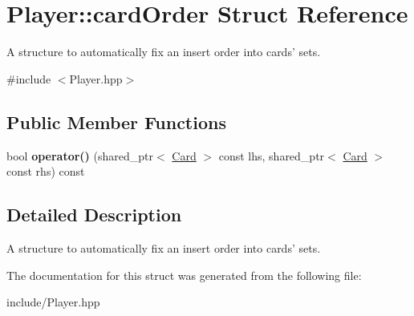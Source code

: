 \hypertarget{structPlayer_1_1cardOrder}{\section{Player\-:\-:card\-Order Struct Reference}
\label{structPlayer_1_1cardOrder}
}


A structure to automatically fix an insert order into cards' sets.  




{\ttfamily \#include $<$Player.\-hpp$>$}

\subsection*{Public Member Functions}
\begin{DoxyCompactItemize}
\item 
\hypertarget{structPlayer_1_1cardOrder_a1992ec2fb8b64e0749dcbbf997a56846}{bool {\bfseries operator()} (shared\-\_\-ptr$<$ \hyperlink{classCard}{Card} $>$ const lhs, shared\-\_\-ptr$<$ \hyperlink{classCard}{Card} $>$ const rhs) const }\label{structPlayer_1_1cardOrder_a1992ec2fb8b64e0749dcbbf997a56846}

\end{DoxyCompactItemize}


\subsection{Detailed Description}
A structure to automatically fix an insert order into cards' sets. 

The documentation for this struct was generated from the following file\-:\begin{DoxyCompactItemize}
\item 
include/Player.\-hpp\end{DoxyCompactItemize}
